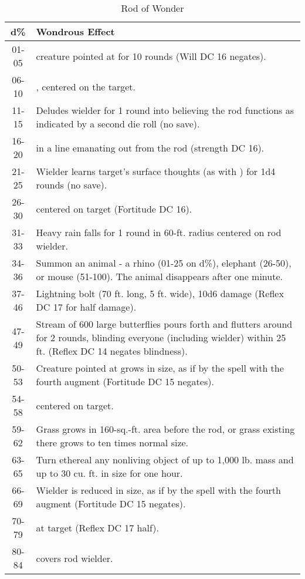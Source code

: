 \begin{table*}
\caption{Rod of Wonder}
\label{tab:RodOfWonder}
\centering
\begin{tabular}{|c|p{}|}
\hline
\textbf{d\%}&\textbf{Wondrous Effect}\\
\hline
01-05&\nameref{Spell:Slow} creature pointed at for 10 rounds (Will DC 16 negates).\\
06-10&\nameref{Spell:FaerieFire}, centered on the target.\\
11-15&Deludes wielder for 1 round into believing the rod functions as indicated by a second die roll (no save).\\
16-20&\nameref{Spell:GustOfWind} in a line emanating out from the rod (strength DC 16).\\
21-25&Wielder learns target's surface thoughts (as with \nameref{Spell:ReadThoughts}) for 1d4 rounds (no save).\\
26-30&\nameref{Spell:NoxiousVapors} centered on target (Fortitude DC 16).\\
31-33&Heavy rain falls for 1 round in 60-ft. radius centered on rod wielder.\\
34-36&Summon an animal - a rhino (01-25 on d\%), elephant (26-50), or mouse (51-100). The animal disappears after one minute.\\
37-46&Lightning bolt (70 ft. long, 5 ft. wide), 10d6 damage (Reflex DC 17 for half damage).\\
47-49&Stream of 600 large butterflies pours forth and flutters around for 2 rounds, blinding everyone (including wielder) within 25 ft. (Reflex DC 14 negates blindness).\\
50-53&Creature pointed at grows in size, as if by the \nameref{Spell:AlterSize} spell with the fourth augment (Fortitude DC 15 negates).\\
54-58&\nameref{Spell:Darkness} centered on target.\\
59-62&Grass grows in 160-sq.-ft. area before the rod, or grass existing there grows to ten times normal size.\\
63-65&Turn ethereal any nonliving object of up to 1,000 lb. mass and up to 30 cu. ft. in size for one hour.\\
66-69&Wielder is reduced in size, as if by the \nameref{Spell:AlterSize} spell with the fourth augment (Fortitude DC 15 negates).\\
70-79&\nameref{Spell:Fireball} at target (Reflex DC 17 half).\\
80-84&\nameref{Spell:Invisibility} covers rod wielder.\\

\end{tabular}
\end{table*}
